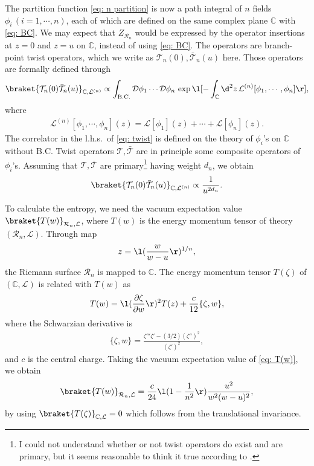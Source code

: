 \documentclass[12pt]{article}
\begin{document}
The partition function \eqref{eq: n partition} is now a path integral of $n$ fields $\phi_i\,(i=1,\cdots,n)$, each of which are defined on the same complex plane $\mathbb C$ with \eqref{eq: BC}.
We may expect that $Z_{\mathcal R_n}$ would be expressed by the operator insertions at $z=0$ and $z=u$ on $\mathbb C$, instead of using \eqref{eq: BC}.
The operators are branch-point twist operators, which we write as $\mathcal T_n(0),\bar{\mathcal T}_n(u)$ here.
Those operators are formally defined through
\begin{align}
	\braket{\mathcal T_n(0)\bar{\mathcal T}_n(u)}_{\mathbb C,\mathcal L^{(n)}}
	\propto
	\int_\mathrm{B.C.}\mathcal D\phi_1\cdots\mathcal D\phi_n\,
	\exp\l[-\int_{\mathbb C}\d^2 z\,\mathcal L^{(n)}[\phi_1,\cdots,\phi_n]\r],
	\label{eq: twist}
\end{align}
where
\begin{align}
	\mathcal L^{(n)}[\phi_1,\cdots,\phi_n](z)
	=
	\mathcal L[\phi_1](z)+\cdots+\mathcal L[\phi_n](z).
	\label{eq: n lagrangian}
\end{align}
The correlator in the l.h.s.\ of \eqref{eq: twist} is defined on the theory of $\phi_i$'s on $\mathbb C$ without B.C.
Twist operators $\mathcal T,\bar{\mathcal T}$ are in principle some composite operators of $\phi_i$'s.
Assuming that $\mathcal T,\bar{\mathcal T}$ are primary\footnote{
I could not understand whether or not twist operators do exist and are primary, but it seems reasonable to think it true according to \cite{Cardy:2007mb}.
}
having weight $d_n$, we obtain
\begin{align}
	\braket{\mathcal T_n(0)\bar{\mathcal T}_n(u)}_{\mathbb C,\mathcal L^{(n)}}\propto
	\frac{1}{u^{2d_n}}.
	\label{eq: TT}
\end{align}

To calculate the entropy, we need the vacuum expectation value $\braket{T(w)}_{\mathcal R_n,\mathcal L}$, where $T(w)$ is the energy momentum tensor of theory $(\mathcal R_n,\mathcal L)$.
Through map
\begin{align}
	z = \l(\frac{w}{w-u} \r)^{1/n},
\end{align}
the Riemann surface $\mathcal R_n$ is mapped to $\mathbb C$.
The energy momentum tensor $T(\zeta)$ of $(\mathbb C,\mathcal L)$ is related with $T(w)$ as
\begin{align}
	T(w) = \l(\frac{\partial \zeta}{\partial w}\r)^2T(z) + \frac{c}{12}\{\zeta,w\},
	\label{eq: T(w)}
\end{align}
where the Schwarzian derivative is
\begin{align}
	\{\zeta,w\} = \frac{\zeta''' \zeta'-(3/2)(\zeta'')^2}{(\zeta')^2},
\end{align}
and $c$ is the central charge.
Taking the vacuum expectation value of \eqref{eq: T(w)}, we obtain
\begin{align}
	\braket{T(w)}_{\mathcal R_n,\mathcal L} = \frac{c}{24}\l(1-\frac{1}{n^2}\r)\frac{u^2}{w^2(w-u)^2},
\end{align}
by using $\braket{T(\zeta)}_{\mathbb C,\mathcal L}=0$ which follows from the translational invariance.
\end{document}
